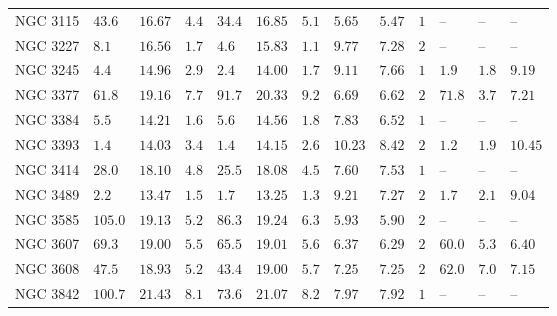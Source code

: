 \begin{table*}
\begin{center}
\begin{tabular}{lllllllllllll}
NGC 3115  \quad &  $43.6$  &  $16.67$  &  $4.4$  \quad \quad &  $34.4$  &  $16.85$  &  $5.1$  &  $5.65$  &  $5.47$  \quad \quad &  $1$  \quad \quad &   -- &   -- &   --    \\ 
NGC 3227  \quad &  $8.1$  &  $16.56$  &  $1.7$  \quad \quad &  $4.6$  &  $15.83$  &  $1.1$  &  $9.77$  &  $7.28$  \quad \quad &  $2$  \quad \quad &   -- &   -- &   --    \\ 
NGC 3245  \quad &  $4.4$  &  $14.96$  &  $2.9$  \quad \quad &  $2.4$  &  $14.00$  &  $1.7$  &  $9.11$  &  $7.66$  \quad \quad &  $1$  \quad \quad &  $1.9$  &  $1.8$  &  $9.19$  \\ 
NGC 3377  \quad &  $61.8$  &  $19.16$  &  $7.7$  \quad \quad &  $91.7$  &  $20.33$  &  $9.2$  &  $6.69$  &  $6.62$  \quad \quad &  $2$  \quad \quad &  $71.8$  &  $3.7$  &  $7.21$  \\ 
NGC 3384  \quad &  $5.5$  &  $14.21$  &  $1.6$  \quad \quad &  $5.6$  &  $14.56$  &  $1.8$  &  $7.83$  &  $6.52$  \quad \quad &  $1$  \quad \quad &   -- &   -- &   --    \\ 
NGC 3393  \quad &  $1.4$  &  $14.03$  &  $3.4$  \quad \quad &  $1.4$  &  $14.15$  &  $2.6$  &  $10.23$  &  $8.42$  \quad \quad &  $2$  \quad \quad &  $1.2$  &  $1.9$  &  $10.45$  \\ 
NGC 3414  \quad &  $28.0$  &  $18.10$  &  $4.8$  \quad \quad &  $25.5$  &  $18.08$  &  $4.5$  &  $7.60$  &  $7.53$  \quad \quad &  $1$  \quad \quad &   -- &   -- &   --    \\ 
NGC 3489  \quad &  $2.2$  &  $13.47$  &  $1.5$  \quad \quad &  $1.7$  &  $13.25$  &  $1.3$  &  $9.21$  &  $7.27$  \quad \quad &  $2$  \quad \quad &  $1.7$  &  $2.1$  &  $9.04$  \\ 
NGC 3585  \quad &  $105.0$  &  $19.13$  &  $5.2$  \quad \quad &  $86.3$  &  $19.24$  &  $6.3$  &  $5.93$  &  $5.90$  \quad \quad &  $2$  \quad \quad &   -- &   -- &   --    \\ 
NGC 3607  \quad &  $69.3$  &  $19.00$  &  $5.5$  \quad \quad &  $65.5$  &  $19.01$  &  $5.6$  &  $6.37$  &  $6.29$  \quad \quad &  $2$  \quad \quad &  $60.0$  &  $5.3$  &  $6.40$  \\ 
NGC 3608  \quad &  $47.5$  &  $18.93$  &  $5.2$  \quad \quad &  $43.4$  &  $19.00$  &  $5.7$  &  $7.25$  &  $7.25$  \quad \quad &  $2$  \quad \quad &  $62.0$  &  $7.0$  &  $7.15$  \\ 
NGC 3842  \quad &  $100.7$  &  $21.43$  &  $8.1$  \quad \quad &  $73.6$  &  $21.07$  &  $8.2$  &  $7.97$  &  $7.92$  \quad \quad &  $1$  \quad \quad &   -- &   -- &   --    \\ 

\end{tabular}
\end{center}
\end{table*}
